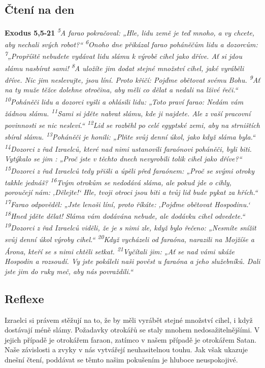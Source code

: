\documentclass[11pt]{article}
\begin{document}
\subsection*{Čtení na den}
\textbf{Exodus 5,5-21}
\newline
\textit{
\textsuperscript{5}A farao pokračoval: „Hle, lidu země je teď mnoho, a vy chcete, aby nechali svých robot?“
\textsuperscript{6}Onoho dne přikázal farao poháněčům lidu a dozorcům:
\textsuperscript{7}„Propříště nebudete vydávat lidu slámu k výrobě cihel jako dříve. Ať si jdou slámu nasbírat sami!
\textsuperscript{8}A uložíte jim dodat stejné množství cihel, jaké vyráběli dříve. Nic jim neslevujte, jsou líní. Proto křičí: Pojďme obětovat svému Bohu.
\textsuperscript{9}Ať na ty muže těžce dolehne otročina, aby měli co dělat a nedali na lživé řeči.“
\textsuperscript{10}Poháněči lidu a dozorci vyšli a ohlásili lidu: „Toto praví farao: Nedám vám žádnou slámu.
\textsuperscript{11}Sami si jděte nabrat slámu, kde ji najdete. Ale z vaší pracovní povinnosti se nic nesleví.“
\textsuperscript{12}Lid se rozběhl po celé egyptské zemi, aby na strništích sbíral slámu.
\textsuperscript{13}Poháněči je honili: „Plňte svůj denní úkol, jako když sláma byla.“
\textsuperscript{14}Dozorci z řad Izraelců, které nad nimi ustanovili faraónovi poháněči, byli biti. Vytýkalo se jim : „Proč jste v těchto dnech nevyrobili tolik cihel jako dříve?“
\textsuperscript{15}Dozorci z řad Izraelců tedy přišli a úpěli před faraónem: „Proč se svými otroky takhle jednáš?
\textsuperscript{16}Tvým otrokům se nedodává sláma, ale pokud jde o cihly, poroučejí nám: ‚Dělejte!‘ Hle, tvoji otroci jsou biti a tvůj lid bude pykat za hřích.“
\textsuperscript{17}Farao odpověděl: „Jste lenoši líní, proto říkáte: ‚Pojďme obětovat Hospodinu.‘
\textsuperscript{18}Hned jděte dělat! Sláma vám dodávána nebude, ale dodávku cihel odvedete.“
\textsuperscript{19}Dozorci z řad Izraelců viděli, že je s nimi zle, když bylo řečeno: „Nesmíte snížit svůj denní úkol výroby cihel.“
\textsuperscript{20}Když vycházeli od faraóna, narazili na Mojžíše a Árona, kteří se s nimi chtěli setkat.
\textsuperscript{21}Vyčítali jim: „Ať se nad vámi ukáže Hospodin a rozsoudí. Vy jste pokáleli naši pověst u faraóna a jeho služebníků. Dali jste jim do ruky meč, aby nás povraždili.“
}

\subsection*{Reflexe}

Izraelci si právem stěžují na to, že by měli vyrábět stejné množství cihel, i když dostávají méně slámy. Požadavky
otrokářů se staly mnohem nedosažitelnějšími. V jejich případě je otrokářem faraon, zatímco v našem případě je
otrokářem Satan. Naše závislosti a zvyky v nás vytvářejí neuhasitelnou touhu. Jak však ukazuje dnešní čtení,
poddávat se těmto našim pokušením je hluboce neuspokojivé.
\end{document}
